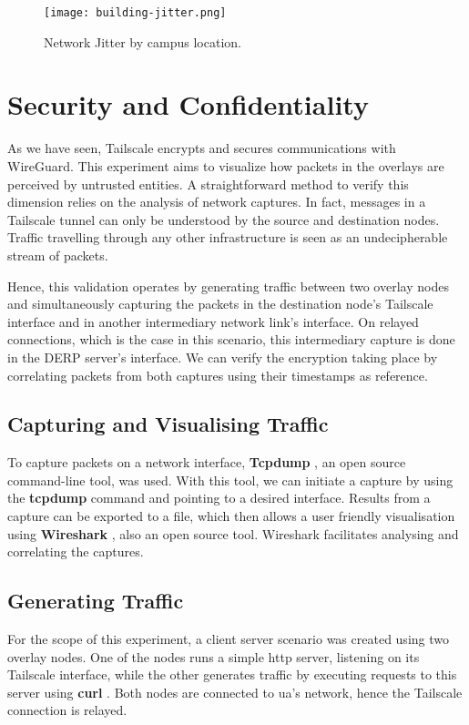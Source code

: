 \documentclass[11pt,twoside,a4paper]{report}
\begin{document}
\begin{figure}[h]
\centering
  \texttt{[image: building-jitter.png]}
  \caption{Network Jitter by campus location.}
  \label{fig:uajitter}
\end{figure}


\section{Security and Confidentiality}

As we have seen, Tailscale encrypts and secures communications with WireGuard. This experiment aims to visualize how packets in the overlays are perceived by untrusted entities. A straightforward method to verify this dimension relies on the analysis of network captures. In fact, messages in a Tailscale tunnel can only be understood by the source and destination nodes. Traffic travelling through any other infrastructure is seen as an undecipherable stream of packets.

Hence, this validation operates by generating traffic between two overlay nodes and simultaneously capturing the packets in the destination node's Tailscale interface and in another intermediary network link's interface. On relayed connections, which is the case in this scenario, this intermediary capture is done in the \ac{DERP} server's interface. We can verify the encryption taking place by correlating packets from both captures using their timestamps as reference.

\subsection{Capturing and Visualising Traffic}

To capture packets on a network interface, \textbf{Tcpdump} \cite{tcpdump}, an open source command-line tool, was used. With this tool, we can initiate a capture by using the \textbf{tcpdump} command and pointing to a desired interface. Results from a capture can be exported to a file, which then allows a user friendly visualisation using \textbf{Wireshark} \cite{wireshark}, also an open source tool. Wireshark facilitates analysing and correlating the captures.

\subsection{Generating Traffic}

For the scope of this experiment, a client server scenario was created using two overlay nodes. One of the nodes runs a simple \ac{http} server, listening on its Tailscale interface, while the other generates traffic by executing requests to this server using \textbf{curl} \cite{curl}. Both nodes are connected to \ac{ua}'s network, hence the Tailscale connection is relayed.
\end{document}
